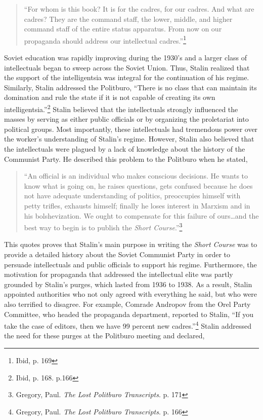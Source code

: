 \documentclass[a4paper, twocolumn]{article}
\begin{document}
\begin{quote}
``For whom is this book? It is for the cadres, for our cadres. And what
are cadres? They are the command staff, the lower, middle, and higher
command staff of the entire status apparatus. From now on our
propaganda should address our intellectual cadres.''\footnote{Ibid, p. 169}

\end{quote}

Soviet education was rapidly improving during the 1930's and a larger
class of intellectuals began to sweep across the Soviet Union. Thus,
Stalin realized that the support of the intelligentsia was integral
for the continuation of his regime. Similarly, Stalin addressed the
Politburo, ``There is no class that can maintain its domination and
rule the state if it is not capable of creating its own
intelligentsia.''\footnote{Ibid, p. 168. p.166} Stalin believed that the intellectuals strongly
influenced the masses by serving as either public officials or by
organizing the proletariat into political groups. Most importantly,
these intellectuals had tremendous power over the worker's
understanding of Stalin's regime.  However, Stalin also believed that
the intellectuals were plagued by a lack of knowledge about the
history of the Communist Party. He described this problem to the
Politburo when he stated,

\begin{quote}
``An official is an individual who makes conscious decisions. He wants
to know what is going on, he raises questions, gets confused because
he does not have adequate understanding of politics, preoccupies
himself with petty trifles, exhausts himself; finally he loses
interest in Marxism and in his bolshevization. We ought to compensate
for this failure of ours…and the best way to begin is to publish the
\emph{Short Course}.''\footnote{Gregory, Paul. \emph{The Lost Politburo Transcripts}. p. 171}
\end{quote}


This quotes proves that Stalin's main purpose in writing the \emph{Short
Course} was to provide a detailed history about the Soviet Communist Party in
order to persuade intellectuals and public officials to support his
regime.  Furthermore, the motivation for propaganda that addressed the
intellectual elite was partly grounded by Stalin's purges, which
lasted from 1936 to 1938. As a result, Stalin appointed authorities
who not only agreed with everything he said, but who were also terrified
to disagree. For example, Comrade Andropov from the Orel Party
Committee, who headed the propaganda department, reported to Stalin,
``If you take the case of editors, then we have 99 percent new
cadres.''\footnote{Gregory, Paul. \emph{The Lost Politburo Transcripts}. p. 166} Stalin addressed the need for these purges at the
Politburo meeting and declared,
\end{document}
